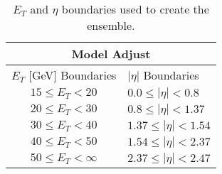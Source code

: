 \begin{comment}

\begin{table}[htb]
	\begin{center}
		{\small
			\begin{tabular}{cccc}
				\hline \hline
				\multicolumn{4}{c}{Model Adjust} \\ \hline \hline
				\multicolumn{4}{c}{$E_{T}$ {[}GeV{]} Boundaries} \\ \hline
				\multicolumn{4}{c}{$15 \leq E_T < 20 $}  \\
				\multicolumn{4}{c}{$20 \leq E_T < 30$}  \\
				\multicolumn{4}{c}{$30 \leq E_T < 40$} \\
				\multicolumn{4}{c}{$40 \leq E_T < 50$} \\
				\multicolumn{4}{c}{$50 \leq E_T < \infty$} \\\hline
				\multicolumn{4}{c}{$|\eta|$ Boundaries} \\ \hline
				\multicolumn{4}{c}{$0,0 \leq |\eta| < 0,8 $}  \\
				\multicolumn{4}{c}{$0,8 \leq |\eta| < 1,37$}  \\
				\multicolumn{4}{c}{$1,37 \leq |\eta| < 1,54$} \\
				\multicolumn{4}{c}{$1,54 \leq |\eta| < 2,37$} \\ 
				\multicolumn{4}{c}{$2,37 \leq |\eta| < 2,47$} \\ 
				\hline
				\hline
			\end{tabular}
		}
	\end{center}
	\caption{$E_T$ and $\eta$ boundaries used to create the ensemble.}
\end{table}

\end{comment}
\begin{table}[htb]
\begin{center}
	{\small
	\begin{tabular}{cccc}
		\hline \hline
		\multicolumn{4}{c}{Model Adjust}                                                                  \\ \hline
		\multicolumn{2}{c|}{$E_T$ {[}GeV{]} Boundaries} & \multicolumn{2}{l}{$|\eta|$ Boundaries}        \\ \hline
		\multicolumn{2}{c|}{$15 \leq E_T < 20 $}        & \multicolumn{2}{l}{$0.0 \leq |\eta| < 0.8 $}   \\
		\multicolumn{2}{c|}{$20 \leq E_T < 30 $}        & \multicolumn{2}{l}{$0.8 \leq |\eta| < 1.37 $}  \\
		\multicolumn{2}{c|}{$30 \leq E_T < 40 $}        & \multicolumn{2}{l}{$1.37 \leq |\eta| < 1.54 $} \\
		\multicolumn{2}{c|}{$40 \leq E_T < 50 $}        & \multicolumn{2}{l}{$1.54 \leq |\eta| < 2.37 $} \\
		\multicolumn{2}{c|}{$50 \leq E_T < \infty $}    & \multicolumn{2}{l}{$2.37 \leq |\eta| < 2.47 $}
	\end{tabular}
}
\end{center}
\caption{$E_T$ and $\eta$ boundaries used to create the ensemble.}
\end{table}